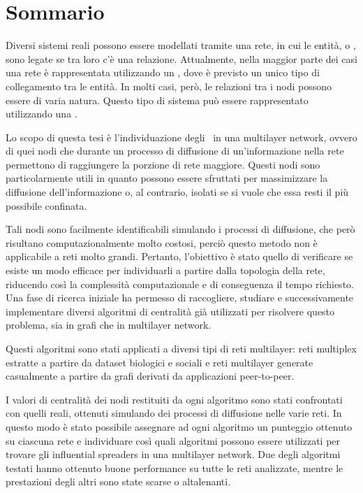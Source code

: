 \setlength{\parskip}{1em}

\chapter*{Sommario} %
\label{sommario}


Diversi sistemi reali possono essere modellati tramite una rete, in cui
le entità, o \nodi, sono legate se tra loro c'è una relazione.
Attualmente, nella maggior parte dei casi una rete è rappresentata utilizzando 
un \grafo, dove è previsto un unico tipo di collegamento tra le entità.
In molti casi, però, le relazioni tra i nodi possono essere di varia natura. 
Questo tipo di sistema può essere rappresentato utilizzando una 
\muln.

Lo scopo di questa tesi è l'individuazione degli \infsp\ in una multilayer network, 
ovvero di quei nodi che durante un processo di diffusione di 
un'informazione nella rete permettono di raggiungere la porzione di rete maggiore. 
Questi nodi sono particolarmente utili in quanto possono essere sfruttati per 
massimizzare la diffusione dell'informazione o, al contrario, 
isolati se si vuole che essa resti il più possibile confinata.

Tali nodi sono facilmente identificabili simulando i processi di diffusione, 
che però risultano computazionalmente molto costosi, perciò questo metodo non 
è applicabile a reti molto grandi.
Pertanto, l'obiettivo è stato quello di verificare se esiste un modo efficace per 
individuarli a partire dalla topologia della rete, riducendo così la complessità computazionale 
e di conseguenza il tempo richiesto.
Una fase di ricerca iniziale ha permesso di raccogliere, studiare 
e successivamente implementare diversi 
algoritmi di centralità già utilizzati per risolvere questo problema, 
sia in grafi che in multilayer network.

Questi algoritmi sono stati applicati a diversi tipi di reti multilayer:
reti multiplex estratte a partire da dataset biologici e 
sociali e reti multilayer generate casualmente 
a partire da grafi derivati da applicazioni peer-to-peer.

I valori di centralità dei nodi restituiti da ogni algoritmo sono stati 
confrontati con quelli reali, ottenuti simulando dei processi di diffusione
nelle varie reti. In questo modo è stato possibile assegnare ad ogni algoritmo
un punteggio ottenuto su ciascuna rete e individuare così quali algoritmi
possono essere utilizzati per trovare gli influential spreaders in una multilayer network.
Due degli algoritmi testati hanno ottenuto buone performance su tutte le
reti analizzate, mentre le prestazioni degli altri sono state scarse o altalenanti.

